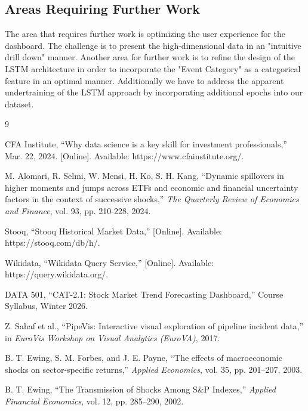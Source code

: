 \documentclass{article}
\begin{document}
\subsection{Areas Requiring Further Work}
The area that requires further work is optimizing the user experience for the dashboard. The challenge is to present the high-dimensional data in an "intuitive drill down" manner. Another area for further work is to refine the design of the LSTM architecture in order to incorporate the "Event Category" as a categorical feature in an optimal manner. Additionally we have to address the apparent undertraining of the LSTM approach by incorporating additional epochs into our dataset.

\pagebreak

\begin{thebibliography}{9}

CFA Institute, ``Why data science is a key skill for investment professionals,'' Mar. 22, 2024. [Online]. Available: https://www.cfainstitute.org/.

M. Alomari, R. Selmi, W. Mensi, H. Ko, S. H. Kang, ``Dynamic spillovers in higher moments and jumps across ETFs and economic and financial uncertainty factors in the context of successive shocks,'' \textit{The Quarterly Review of Economics and Finance}, vol. 93, pp. 210-228, 2024.

Stooq, ``Stooq Historical Market Data,'' [Online]. Available: https://stooq.com/db/h/.

Wikidata, ``Wikidata Query Service,'' [Online]. Available: https://query.wikidata.org/.

DATA 501, ``CAT-2.1: Stock Market Trend Forecasting Dashboard,'' Course Syllabus, Winter 2026.

Z. Sahaf et al., ``PipeVis: Interactive visual exploration of pipeline incident data,'' in \textit{EuroVis Workshop on Visual Analytics (EuroVA)}, 2017.

B. T. Ewing, S. M. Forbes, and J. E. Payne, ``The effects of macroeconomic shocks on sector-specific returns,'' \textit{Applied Economics}, vol. 35, pp. 201--207, 2003.

B. T. Ewing, ``The Transmission of Shocks Among S\&P Indexes,'' \textit{Applied Financial Economics}, vol. 12, pp. 285--290, 2002.

\end{thebibliography}
\end{document}

